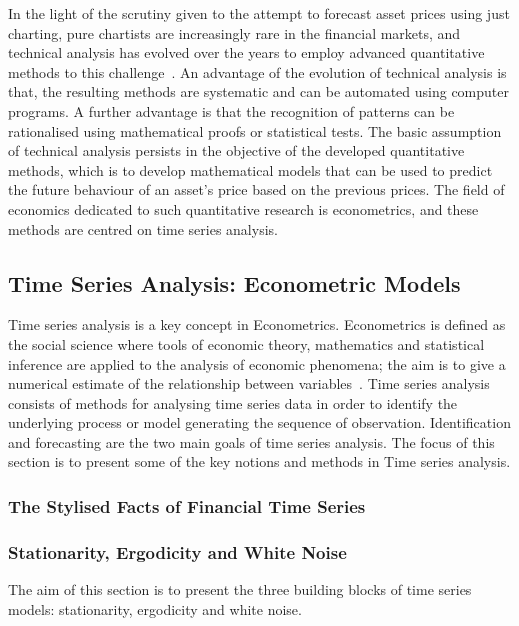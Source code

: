 \documentclass[13pt]{report}
\begin{document}
In the light of the scrutiny given to the attempt to forecast asset prices using just charting, pure chartists are increasingly rare in the financial markets, and technical analysis has evolved over the years to employ advanced quantitative methods to this challenge~\cite{methodslo2011evolution}. An  advantage of the evolution of technical analysis is that, the resulting methods are systematic and can be automated using computer programs. A further advantage is that the recognition of patterns can be rationalised using mathematical proofs or statistical tests. The basic assumption of technical analysis persists in the objective of the developed quantitative methods, which is to develop mathematical models that can be used to predict the future behaviour of an asset's price based on the previous prices. The field of economics dedicated to such quantitative research is econometrics, and these methods are centred on time series analysis. 

\subsection{Time Series Analysis: Econometric Models}
Time series analysis is a key concept in Econometrics. Econometrics is defined as the social science where tools of economic theory, mathematics and statistical inference are applied to the analysis of economic phenomena; the aim is to give a numerical estimate of the relationship between variables~\cite{gujarati1999essentials}. Time series analysis consists of methods for analysing time series data in order to identify the underlying process or model generating the sequence of observation. Identification and forecasting are the two main goals of time series analysis. The focus of this section is to present some of the key notions and methods in Time series analysis.\par

\subsubsection{The Stylised Facts of Financial Time Series}

\subsubsection{Stationarity, Ergodicity and White Noise}
The aim of this section is to present the three building blocks of time series models: stationarity, ergodicity and white noise.\par
\end{document}
